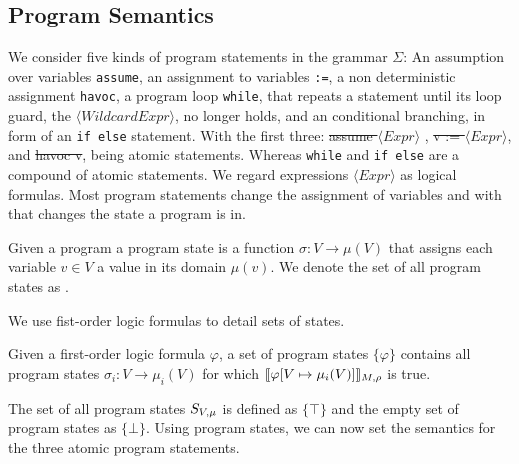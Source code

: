 \subsection{Program Semantics}
We consider five kinds of program statements in the grammar $\Sigma$: An assumption over variables \texttt{assume}, an assignment to variables \texttt{:=}, a non deterministic assignment \texttt{havoc}, a program loop \texttt{while}, that repeats a statement until its loop guard, the $\langle WildcardExpr \rangle$, no longer holds, and an conditional branching, in form of an \texttt{if else} statement. With the first three: \st{assume $\langle Expr \rangle$ }, \st{v := $\langle Expr \rangle$}, and \st{havoc v}, being atomic statements. Whereas \texttt{while} and \texttt{if else} are a compound of atomic statements.
We regard expressions $\langle Expr \rangle$ as logical formulas. Most program statements change the assignment of variables and with that changes the state a program is in. 
\begin{mydef}
	Given a program \prg a program state is a function $\sigma: V \rightarrow \mu(V)$ that assigns each variable $v \in V$ a value in its domain $\mu(v)$. We denote the set of all program states as \stateSpace.
\end{mydef}
We use fist-order logic formulas to detail sets of states.
\begin{mydef}
	Given a first-order logic formula $\varphi$, a set of program states $\{ \varphi \}$ contains all program states $\sigma_i: V \rightarrow \mu_i(V)$ for which $\llbracket \varphi [V\mapsto \mu_i(V) ] \rrbracket_{M, \rho}$ is true.
\end{mydef}
The set of all program states $S_{V, \mu}$ is defined as $\{\top\}$ and the empty set of program states as $\{\bot\}$.
Using program states, we can now set the semantics for the three atomic program statements.

